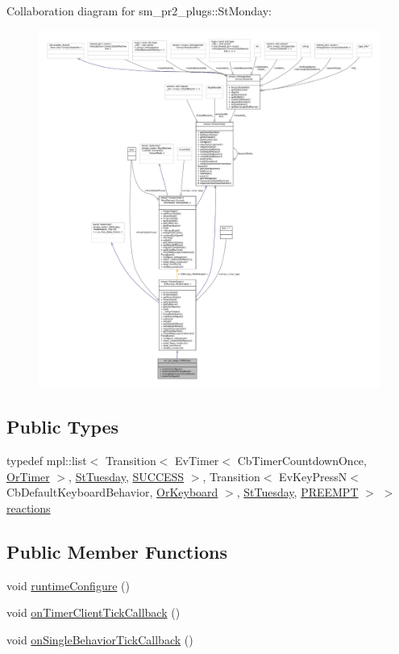 Collaboration diagram for sm\+\_\+pr2\+\_\+plugs\+:\+:St\+Monday\+:
\nopagebreak
\begin{figure}[H]
\begin{center}
\leavevmode
\includegraphics[width=350pt]{structsm__pr2__plugs_1_1StMonday__coll__graph}
\end{center}
\end{figure}
\subsection*{Public Types}
\begin{DoxyCompactItemize}
\item 
typedef mpl\+::list$<$ Transition$<$ Ev\+Timer$<$ Cb\+Timer\+Countdown\+Once, \hyperlink{classsm__pr2__plugs_1_1OrTimer}{Or\+Timer} $>$, \hyperlink{structsm__pr2__plugs_1_1StTuesday}{St\+Tuesday}, \hyperlink{classSUCCESS}{S\+U\+C\+C\+E\+SS} $>$, Transition$<$ Ev\+Key\+PressN$<$ Cb\+Default\+Keyboard\+Behavior, \hyperlink{classsm__pr2__plugs_1_1OrKeyboard}{Or\+Keyboard} $>$, \hyperlink{structsm__pr2__plugs_1_1StTuesday}{St\+Tuesday}, \hyperlink{classPREEMPT}{P\+R\+E\+E\+M\+PT} $>$ $>$ \hyperlink{structsm__pr2__plugs_1_1StMonday_a3d5035b058247dc9e30664ff2b50823c}{reactions}
\end{DoxyCompactItemize}
\subsection*{Public Member Functions}
\begin{DoxyCompactItemize}
\item 
void \hyperlink{structsm__pr2__plugs_1_1StMonday_a537ddc95373aa7533fd95b27029e3888}{runtime\+Configure} ()
\item 
void \hyperlink{structsm__pr2__plugs_1_1StMonday_aaefb67b13116347bfed4194e82c1b4ba}{on\+Timer\+Client\+Tick\+Callback} ()
\item 
void \hyperlink{structsm__pr2__plugs_1_1StMonday_ab87a04daa309d33c887cfed1204fcff3}{on\+Single\+Behavior\+Tick\+Callback} ()
\end{DoxyCompactItemize}
